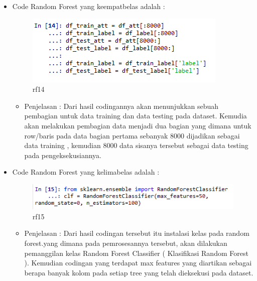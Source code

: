 \begin{enumerate}
\begin{itemize}
\begin{itemize}
\par
\par
\end{itemize}
\item Code Random Forest yang keempatbelas adalah :
\par
\begin{figure}[ht]
\centering
\includegraphics[scale=0.4]{figures/rf14.png}
\caption{rf14}
\label{contoh}
\end{figure}
\par
\begin{itemize}
\item Penjelasan : Dari hasil codingannya akan menunjukkan sebuah pembagian untuk data training dan data testing pada dataset. Kemudia akan melakukan pembagian data menjadi dua bagian yang dimana untuk row/baris pada data bagian pertama sebanyak 8000 dijadikan sebagai data training , kemudian 8000 data sisanya tersebut sebagai data testing pada pengeksekusiannya.
\par
\par
\end{itemize}
\item Code Random Forest yang kelimabelas adalah :
\par
\begin{figure}[ht]
\centering
\includegraphics[scale=0.4]{figures/rf15.png}
\caption{rf15}
\label{contoh}
\end{figure}
\par
\begin{itemize}
\item Penjelasan : Dari hasil codingan tersebut itu instalasi kelas pada random forest.yang dimana pada pemrosesannya tersebut, akan dilakukan pemanggilan kelas Random Forest Classifier ( Klasifikasi Random Forest ). Kemudian codingan yang terdapat max features yang diartikan sebagai berapa banyak kolom pada setiap tree yang telah dieksekusi pada dataset. 
\par
\par

\end{itemize}
\end{itemize}
\end{enumerate}
